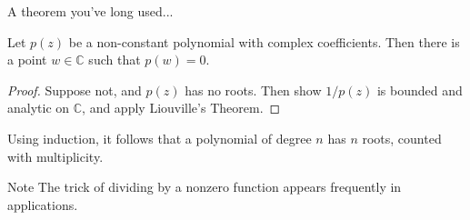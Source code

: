 \documentclass{beamer}
\newcommand{\C}{\mathbb{C}}
\begin{document}
\begin{frame}{A theorem you've long used...}
\begin{theorem} Let $p(z)$ be a non-constant polynomial with complex coefficients.  Then there is a point $w\in\C$ such that $p(w)=0.$\end{theorem}

\begin{proof}
Suppose not, and $p(z)$ has no roots. Then show $1/p(z)$ is bounded and analytic on $\C$, and apply Liouville's Theorem.
\end{proof}
Using induction, it follows that a polynomial of degree $n$ has $n$ roots, counted with multiplicity.

\begin{block}{Note}
The trick of dividing by a nonzero function appears frequently in applications.
\end{block}

\end{frame}
\end{document}
